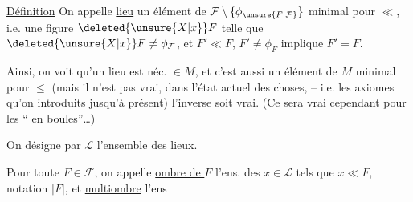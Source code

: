 


\noindent\llap{\smash{\rule[-2.1\baselineskip]{.35pt}{2.8\baselineskip}}\hspace{.6em}}\uline{Définition} On appelle \uline{lieu}  un élément de $\mathcal F\setminus\{\phi_{\unsure{F|\mathcal F}}\}$ minimal pour $\ll$, i.e. une figure $\deleted{\unsure{X|x}}F$ telle que $\deleted{\unsure{X|x}}F\neq\phi_{\mathcal F}$, et $F'\ll F$, $F'\neq\phi_F$ implique $F'=F$.

Ainsi, on voit qu'un lieu est néc. $\in M$, et c'est aussi un élément de $M$ minimal pour $\leq$ (mais il n'est pas vrai, dans l'état actuel des choses, -- i.e.  les axiomes qu'on  introduits jusqu'à présent) l'inverse soit vrai. (Ce sera vrai cependant pour les `` en boules''\ldots)

On désigne par $\mathcal L$ l'ensemble des lieux.

 Pour toute $F\in\mathcal F$, on appelle \uline{ombre de $F$} l'ens. des $x\in\mathcal L$ tels que $x\ll F$, notation $\lvert F\rvert$, et \uline{multiombre} l'ens

